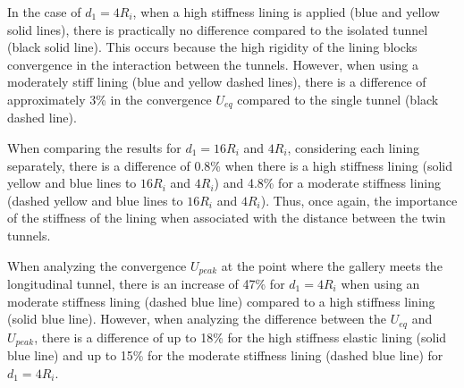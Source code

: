 \documentclass[a4paper,fleqn]{cas-sc}
\begin{document}
\FloatBarrier
In the case of $d_1=4R_i$, when a high stiffness lining is applied (blue and yellow solid lines), there is practically no difference compared to the isolated tunnel (black solid line). This occurs because the high rigidity of the lining blocks convergence in the interaction between the tunnels. However, when using a moderately stiff lining (blue and yellow dashed lines), there is a difference of approximately 3\% in the convergence $U_{eq}$ compared to the single tunnel (black dashed line).

When comparing the results for $d_1 = 16R_i$ and $4R_i$, considering each lining separately, there is a difference of 0.8\% when there is a high stiffness lining (solid yellow and blue lines to $16R_i$ and $4R_i$) and 4.8\% for a moderate stiffness lining (dashed yellow and blue lines to $16R_i$ and $4R_i$). Thus, once again, the importance of the stiffness of the lining when associated with the distance between the twin tunnels.

When analyzing the convergence $U_{peak}$ at the point where the gallery meets the longitudinal tunnel, there is an increase of 47\% for $d_1=4R_i$ when using an moderate stiffness lining (dashed blue line) compared to a high stiffness lining (solid blue line). However, when analyzing the difference between the $U_{eq}$ and $U_{peak}$, there is a difference of up to 18\% for the high stiffness elastic lining (solid blue line) and up to 15\% for the moderate stiffness lining (dashed blue line) for $d_1=4R_i$.
\end{document}
